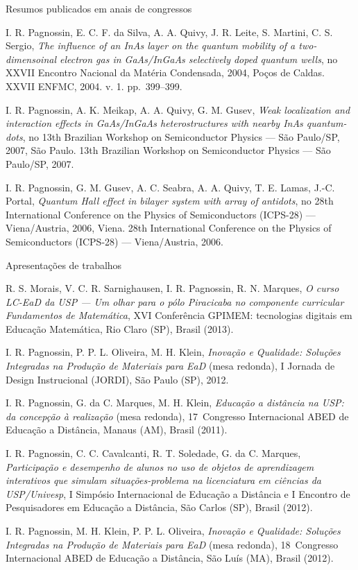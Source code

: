 \begin{compactitem}
	\item Resumos publicados em anais de congressos
	\begin{compactitem}
		\item I. R. Pagnossin, E. C. F. da Silva, A. A. Quivy, J. R. Leite, S. Martini, C. S. Sergio, \textsl{The influence of an InAs layer on the quantum mobility of a two-dimensoinal electron gas in GaAs/InGaAs selectively doped quantum wells}, no XXVII Encontro Nacional da Matéria Condensada, 2004, Poços de Caldas. XXVII ENFMC, 2004. v. 1. pp.~399--399.
		\item I. R. Pagnossin, A. K. Meikap, A. A. Quivy, G. M. Gusev, \textsl{Weak localization and interaction effects in GaAs/InGaAs heterostructures with nearby InAs quantum-dots}, no 13th Brazilian Workshop on Semiconductor Physics --- São Paulo/SP, 2007, São Paulo. 13th Brazilian Workshop on Semiconductor Physics --- São Paulo/SP, 2007.
		\item I. R. Pagnossin, G. M. Gusev, A. C. Seabra, A. A. Quivy, T. E. Lamas, J.-C. Portal, \textsl{Quantum Hall effect in bilayer system with array of antidots}, no 28th International Conference on the Physics of Semiconductors (ICPS-28) --- Viena/Austria, 2006, Viena. 28th International Conference on the Physics of Semiconductors (ICPS-28) --- Viena/Austria, 2006.	
	\end{compactitem}
	
	\item Apresentações de trabalhos
	\begin{compactitem}
		\item R. S. Morais, V. C. R. Sarnighausen, I. R. Pagnossin, R. N. Marques, \textsl{O curso LC-EaD da USP --- Um olhar para o pólo Piracicaba no componente curricular Fundamentos de Matemática}, XVI Conferência GPIMEM: tecnologias digitais em Educação Matemática, Rio Claro (SP), Brasil (2013).
		\item I. R. Pagnossin, P. P. L. Oliveira, M. H. Klein, \textsl{Inovação e Qualidade: Soluções Integradas na Produção de Materiais para EaD} (mesa redonda), I Jornada de Design Instrucional (JORDI), São Paulo (SP), 2012.
		\item I. R. Pagnossin, G. da C. Marques, M. H. Klein, \textsl{Educação a distância na USP: da concepção à realização} (mesa redonda), 17\textordmasculine\ Congresso Internacional ABED de Educação a Distância, Manaus (AM), Brasil (2011).
		\item I. R. Pagnossin, C. C. Cavalcanti, R. T. Soledade, G. da C. Marques, \textsl{Participação e desempenho de alunos no uso de objetos de aprendizagem interativos que simulam situações-problema na licenciatura em ciências da USP/Univesp}, I Simpósio Internacional de Educação a Distância e I Encontro de Pesquisadores em Educação a Distância, São Carlos (SP), Brasil (2012).
		\item I. R. Pagnossin, M. H. Klein, P. P. L. Oliveira, \textsl{Inovação e Qualidade: Soluções Integradas na Produção de Materiais para EaD} (mesa redonda), 18\textordmasculine\ Congresso Internacional ABED de Educação a Distância, São Luís (MA), Brasil (2012).
	\end{compactitem}
	

\end{compactitem}
